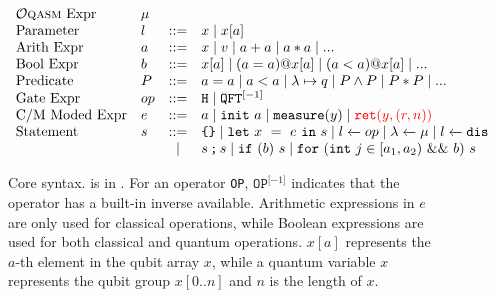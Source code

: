 \begin{figure}[t]
{
  \small
  \[\begin{array}{llcl} 
      \text{\oqasm Expr} & \mu\\
      \text{Parameter} & l & ::= & x \mid x[a] \\
      \text{Arith Expr} & a & ::= & x \mid v \mid a + a \mid a * a \mid ... \\
      \text{Bool Expr} & b & ::= & x[a] \mid (a = a) @ x[a] \mid (a < a) @ x[a] \mid ... \\
      \text{Predicate} & P & ::= & a = a \mid a < a \mid \lambda \mapsto q \mid P \wedge P \mid P * P \mid ... \\
      \text{Gate Expr} & op & ::= & \texttt{H} \mid \iqft[\lbrack -1 \rbrack]{}{} \\
      \text{C/M Moded Expr}& e & ::= & a \mid \sinit{a} \mid \smea{y} \mid \textcolor{red}{\sret{y,(r,n)}} \\
      \text{Statement} & s & ::= & \sskip \mid \sexp{x}{e}{s} \mid  \ssassign{l}{}{op} \mid \ssassign{\lambda}{}{\mu} 
                                 \mid \ssassign{l}{}{\sdis}
                                 \\ & & \mid & \sseq{s}{s} \mid \sifq{b}{s} \mid
                                     \sqwhile{j}{a_1}{a_2}{b}{s}
    \end{array}
  \]
}
  \caption{Core \qafny syntax. \oqasm is in . For an operator \texttt{OP}, $\texttt{OP}^{\lbrack -1 \rbrack}$ indicates that the operator has a built-in inverse available. Arithmetic expressions in $e$ are only used for classical operations, while Boolean expressions are used for both classical and quantum operations. $x[a]$ represents the $a$-th element in the qubit array $x$, while a quantum variable $x$ represents the qubit group $x[0..n]$ and $n$ is the length of $x$. }
  \label{fig:vqimpappx}
\end{figure}


